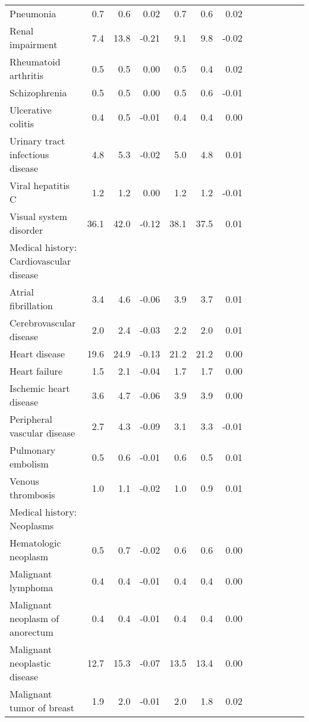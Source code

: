 \documentclass[11pt,]{article}
\begin{document}
\begin{longtable}{lrrrrrrrrrrrr}
      Pneumonia &  0.7 &  0.6 &  0.02 &  0.7 &  0.6 &  0.02 \\ 
      Renal impairment &  7.4 & 13.8 & -0.21 &  9.1 &  9.8 & -0.02 \\ 
      Rheumatoid arthritis &  0.5 &  0.5 &  0.00 &  0.5 &  0.4 &  0.02 \\ 
      Schizophrenia &  0.5 &  0.5 &  0.00 &  0.5 &  0.6 & -0.01 \\ 
      Ulcerative colitis &  0.4 &  0.5 & -0.01 &  0.4 &  0.4 &  0.00 \\ 
      Urinary tract infectious disease &  4.8 &  5.3 & -0.02 &  5.0 &  4.8 &  0.01 \\ 
      Viral hepatitis C &  1.2 &  1.2 &  0.00 &  1.2 &  1.2 & -0.01 \\ 
      Visual system disorder & 36.1 & 42.0 & -0.12 & 38.1 & 37.5 &  0.01 \\ 
  Medical history: Cardiovascular disease &    &    &     &    &    &     \\ 
      Atrial fibrillation &  3.4 &  4.6 & -0.06 &  3.9 &  3.7 &  0.01 \\ 
      Cerebrovascular disease &  2.0 &  2.4 & -0.03 &  2.2 &  2.0 &  0.01 \\ 
      Heart disease & 19.6 & 24.9 & -0.13 & 21.2 & 21.2 &  0.00 \\ 
      Heart failure &  1.5 &  2.1 & -0.04 &  1.7 &  1.7 &  0.00 \\ 
      Ischemic heart disease &  3.6 &  4.7 & -0.06 &  3.9 &  3.9 &  0.00 \\ 
      Peripheral vascular disease &  2.7 &  4.3 & -0.09 &  3.1 &  3.3 & -0.01 \\ 
      Pulmonary embolism &  0.5 &  0.6 & -0.01 &  0.6 &  0.5 &  0.01 \\ 
      Venous thrombosis &  1.0 &  1.1 & -0.02 &  1.0 &  0.9 &  0.01 \\ 
  Medical history: Neoplasms &    &    &     &    &    &     \\ 
      Hematologic neoplasm &  0.5 &  0.7 & -0.02 &  0.6 &  0.6 &  0.00 \\ 
      Malignant lymphoma &  0.4 &  0.4 & -0.01 &  0.4 &  0.4 &  0.00 \\ 
      Malignant neoplasm of anorectum &  0.4 &  0.4 & -0.01 &  0.4 &  0.4 &  0.00 \\ 
      Malignant neoplastic disease & 12.7 & 15.3 & -0.07 & 13.5 & 13.4 &  0.00 \\ 
      Malignant tumor of breast &  1.9 &  2.0 & -0.01 &  2.0 &  1.8 &  0.02 \\ 

\end{longtable}
\end{document}
